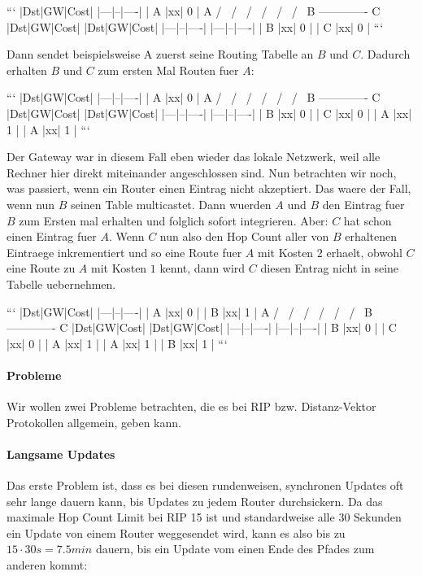 ```
    |Dst|GW|Cost|
    |---|--|----|
    | A |xx|  0 |
	      A
	    /   \
	   /     \
	  /       \
	 /         \
	/           \
   /             \
  B ------------- C
|Dst|GW|Cost|   |Dst|GW|Cost|
|---|--|----|   |---|--|----|
| B |xx|  0 |   | C |xx|  0 |
```

Dann sendet beispielsweise A zuerst seine Routing Tabelle an $B$ und
$C$. Dadurch erhalten $B$ und $C$ zum ersten Mal Routen fuer $A$:

```
    |Dst|GW|Cost|
    |---|--|----|
    | A |xx|  0 |
	      A
	    /   \
	   /     \
	  /       \
	 /         \
	/           \
   /             \
  B ------------- C
|Dst|GW|Cost|   |Dst|GW|Cost|
|---|--|----|   |---|--|----|
| B |xx|  0 |   | C |xx|  0 |
| A |xx|  1 |   | A |xx|  1 |
```

Der Gateway war in diesem Fall eben wieder das lokale Netzwerk, weil alle
Rechner hier direkt miteinander angeschlossen sind. Nun betrachten wir noch, was
passiert, wenn ein Router einen Eintrag nicht akzeptiert. Das waere der Fall,
wenn nun $B$ seinen Table multicastet. Dann wuerden $A$ und $B$ den Eintrag fuer
$B$ zum Ersten mal erhalten und folglich sofort integrieren. Aber: $C$ hat schon
einen Eintrag fuer $A$. Wenn $C$ nun also den Hop Count aller von $B$ erhaltenen
Eintraege inkrementiert und so eine Route fuer $A$ mit Kosten $2$ erhaelt,
obwohl $C$ eine Route zu $A$ mit Kosten $1$ kennt, dann wird $C$ diesen Entrag
nicht in seine Tabelle uebernehmen.

```
    |Dst|GW|Cost|
    |---|--|----|
    | A |xx|  0 |
	| B |xx|  1 |
	      A
	    /   \
	   /     \
	  /       \
	 /         \
	/           \
   /             \
  B ------------- C
|Dst|GW|Cost|   |Dst|GW|Cost|
|---|--|----|   |---|--|----|
| B |xx|  0 |   | C |xx|  0 |
| A |xx|  1 |   | A |xx|  1 |
                | B |xx|  1 |
```

\paragraph{Probleme} 

Wir wollen zwei Probleme betrachten, die es bei RIP bzw. Distanz-Vektor
Protokollen allgemein, geben kann.

\paragraph{Langsame Updates} 

Das erste Problem ist, dass es bei diesen rundenweisen, synchronen Updates oft
sehr lange dauern kann, bis Updates zu jedem Router durchsickern. Da das
maximale Hop Count Limit bei RIP 15 ist und standardweise alle 30 Sekunden ein
Update von einem Router weggesendet wird, kann es also bis zu $15 \cdot 30s =
7.5 min$ dauern, bis ein Update vom einen Ende des Pfades zum anderen kommt:



